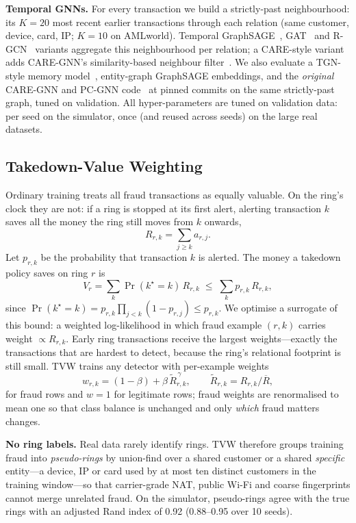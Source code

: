 \documentclass[10pt,letterpaper]{article}
\begin{document}
\textbf{Temporal GNNs.} For every transaction we build a strictly-past neighbourhood: its $K=20$ most recent earlier transactions through each relation (same customer, device, card, IP; $K=10$ on AMLworld). Temporal GraphSAGE~\cite{hamilton2017sage}, GAT~\cite{velickovic2018gat} and R-GCN~\cite{schlichtkrull2018rgcn} variants aggregate this neighbourhood per relation; a CARE-style variant adds CARE-GNN's similarity-based neighbour filter~\cite{dou2020care}. We also evaluate a TGN-style memory model~\cite{rossi2020tgn}, entity-graph GraphSAGE embeddings, and the \emph{original} CARE-GNN and PC-GNN code~\cite{dou2020care,liu2021pcgnn} at pinned commits on the same strictly-past graph, tuned on validation. All hyper-parameters are tuned on validation data: per seed on the simulator, once (and reused across seeds) on the large real datasets.

\subsection{Takedown-Value Weighting}\label{sec:tvw}
Ordinary training treats all fraud transactions as equally valuable. On the ring's clock they are not: if a ring is stopped at its first alert, alerting transaction $k$ saves all the money the ring still moves from $k$ onwards,
\begin{equation}
R_{r,k}=\sum_{j\ge k}a_{r,j}.
\end{equation}
Let $p_{r,k}$ be the probability that transaction $k$ is alerted. The money a takedown policy saves on ring $r$ is
\begin{equation}
V_r=\sum_{k}\Pr(k^\star=k)\,R_{r,k}\;\le\;\sum_k p_{r,k}\,R_{r,k},
\end{equation}
since $\Pr(k^\star=k)=p_{r,k}\prod_{j<k}(1-p_{r,j})\le p_{r,k}$. We optimise a surrogate of this bound: a weighted log-likelihood in which fraud example $(r,k)$ carries weight $\propto R_{r,k}$. Early ring transactions receive the largest weights---exactly the transactions that are hardest to detect, because the ring's relational footprint is still small. TVW trains any detector with per-example weights
\begin{equation}
w_{r,k}=(1-\beta)+\beta\,\tilde R_{r,k}^{\,\gamma},\qquad \tilde R_{r,k}=R_{r,k}/\overline{R},
\end{equation}
for fraud rows and $w=1$ for legitimate rows; fraud weights are renormalised to mean one so that class balance is unchanged and only \emph{which} fraud matters changes.

\textbf{No ring labels.} Real data rarely identify rings. TVW therefore groups training fraud into \emph{pseudo-rings} by union-find over a shared customer or a shared \emph{specific} entity---a device, IP or card used by at most ten distinct customers in the training window---so that carrier-grade NAT, public Wi-Fi and coarse fingerprints cannot merge unrelated fraud. On the simulator, pseudo-rings agree with the true rings with an adjusted Rand index of 0.92 (0.88--0.95 over 10 seeds).
\end{document}
